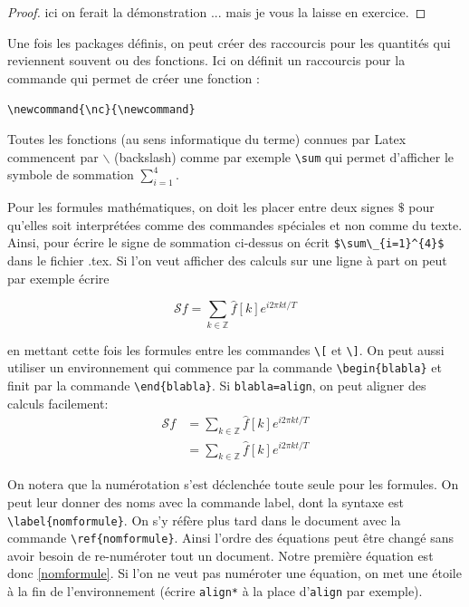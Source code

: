 \begin{proof}
 ici on ferait la démonstration ... mais  je vous la laisse en exercice.
\end{proof}



Une fois les packages définis, on peut créer des raccourcis pour les quantités qui reviennent 
souvent ou des fonctions. Ici on définit un raccourcis pour la commande qui permet de créer une
 fonction :\medskip

\lstinline+\newcommand{\nc}{\newcommand}+

\begin{rem}
 Toutes les fonctions (au sens informatique du terme) connues par Latex commencent par $\backslash$ 
(backslash) comme par exemple \lstinline+\sum+
 qui permet d'afficher le symbole de sommation $\sum_{i=1}^{4}$. 
\end{rem}


Pour les formules mathématiques, on doit les placer entre deux signes 
$\$$ pour qu'elles soit interprétées comme des commandes spéciales et non comme du texte. 
Ainsi, pour écrire le signe de sommation ci-dessus on écrit \lstinline+$\sum\_{i=1}^{4}$+ dans le 
fichier .tex. Si l'on veut afficher des calculs sur une ligne à part on peut par exemple écrire 

\[\mathcal{S}f = \sum_{k\in\mathbb{Z}} \hat{f}[k] e^{i2\pi kt/T} \] 

en mettant cette fois les formules  entre  les commandes 
\lstinline+\[+ et \lstinline+\]+. On peut aussi utiliser un environnement qui commence par la 
commande 
\lstinline+\begin{blabla}+ et finit par la commande \lstinline+\end{blabla}+. Si \lstinline+blabla=align+, 
on peut aligner des calculs facilement:
\begin{align}
 \mathcal{S}f & = \sum_{k\in\mathbb{Z}} \hat f[k] e^{i2\pi kt/T} \label{nomformule}\\
  & = \sum_{k\in\mathbb{Z}} \hat f[k] e^{i2\pi kt/T}
\end{align}

\begin{rem}
On notera que la numérotation s'est déclenchée toute seule pour les formules. 
On peut  leur donner des noms avec la commande label,  dont la syntaxe est  \lstinline+\label{nomformule}+.  
On s'y réfère plus tard dans le document  avec la commande \lstinline+\ref{nomformule}+. 
Ainsi l'ordre des équations peut être changé sans avoir besoin de re-numéroter tout un document. 
Notre première équation est donc \ref{nomformule}. 
Si l'on ne veut pas numéroter une équation,  on met une étoile à la fin de l'environnement 
(écrire \lstinline+align*+ à la place d'\lstinline+align+ par exemple).
\end{rem}



